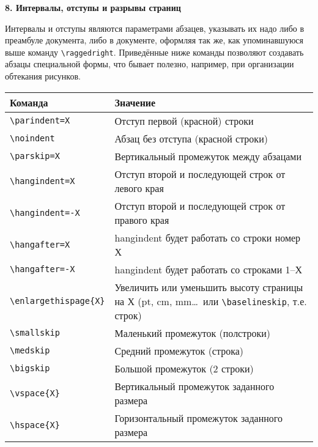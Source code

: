 \documentclass{article}
\begin{document}
\newpage

\textbf{8. Интервалы, отступы и разрывы страниц}

\bigskip

Интервалы и отступы являются параметрами абзацев, указывать их надо либо в преамбуле документа, либо в документе, оформляя так же, как упоминавшуюся выше команду \verb"\raggedright". Приведённые ниже команды позволяют создавать абзацы специальной формы, что бывает полезно, например, при организации обтекания рисунков.

\bigskip

\begin{center}
\begin{tabular}{lp{8cm}}
\bfseries Команда         & \bfseries Значение                                      \\ \hline
\verb"\parindent=X"       & Отступ первой (красной) строки                          \\
\verb"\noindent"          & Абзац без отступа (красной строки)                      \\
\verb"\parskip=X"         & Вертикальный промежуток между абзацами                  \\ \hline
\verb"\hangindent=X"      & Отступ второй и последующей строк от левого края        \\
\verb"\hangindent=-X"     & Отступ второй и последующей строк от правого края       \\
\verb"\hangafter=X"       & hangindent будет работать со строки номер Х             \\
\verb"\hangafter=-X"      & hangindent будет работать со строками 1--Х              \\ \hline
\verb"\enlargethispage{X}"& Увеличить или уменьшить высоту страницы на Х
                            (pt, cm, mm\ldots\ или \verb"\baselineskip", т.е. строк)\\ \hline
\verb"\smallskip"         & Маленький промежуток (полстроки)                        \\
\verb"\medskip"           & Средний промежуток (строка)                             \\
\verb"\bigskip"           & Большой промежуток (2 строки)                           \\ \hline
\verb"\vspace{X}"         & Вертикальный промежуток заданного размера               \\
\verb"\hspace{X}"         & Горизонтальный промежуток заданного размера             \\
\end{tabular}
\end{center}
\end{document}

